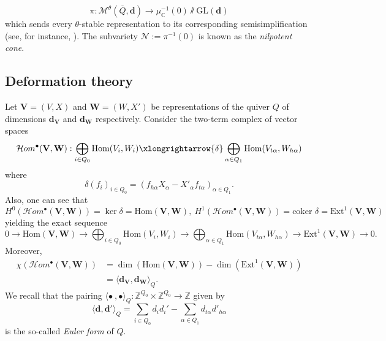 \documentclass{amsart}
\theoremstyle{plain}
\numberwithin{equation}{section}
\theoremstyle{definition}
\theoremstyle{remark}
\begin{document}
	$$
	\pi:\mathcal{M}^{\theta}(\overline{Q},\mathbf{d}) \to \mu^{-1}_{\mathbb{C}}(0)\sslash\text{GL}(\mathbf{d})
	$$ 
	which sends every $\theta$-stable representation to its corresponding semisimplification (see, for instance, \cite[Theorem 10.12]{libroKirillov}). The subvariety $\mathcal{N}:=\pi^{-1}(0)$ is known as the \emph{nilpotent cone}. 
	
	\subsection{Deformation theory}\label{deformationTheorySection}
	Let $\mathbf{V}=(V,X)$ and $\mathbf{W}=(W,X')$ be representations of the quiver $Q$ of dimensions $\mathbf{d}_\mathbf{V}$ and $\mathbf{d}_\mathbf{W}$ respectively. Consider the two-term complex of vector spaces 
	\begin{equation}\label{deformationComplexQuiverVarieties}
		\mathcal{H}om^\bullet(\mathbf{V},\mathbf{W}): \bigoplus_{i\in Q_0}\text{Hom}(V_i,W_i)\xlongrightarrow{\delta}\bigoplus_{\alpha\in Q_1}\text{Hom}(V_{t\alpha},W_{h\alpha})
	\end{equation}
	where 
	$$
	\delta(f_i)_{i\in Q_0}=(f_{h\alpha}X_{\alpha}-X'_\alpha f_{t\alpha})_{\alpha\in Q_1}.
	$$
	Also, one can see that 
	$$
	H^0(\mathcal{H}om^\bullet(\mathbf{V},\mathbf{W}))=\ker\delta=\text{Hom}(\mathbf{V},\mathbf{W}), \
	H^1(\mathcal{H}om^\bullet(\mathbf{V},\mathbf{W}))=\text{coker }\delta=\text{Ext}^1(\mathbf{V},\mathbf{W})
	$$
	yielding the exact sequence
	\begin{equation}\label{fundamentalExactSequenceQuivers}
		0\to \text{Hom}(\mathbf{V},\mathbf{W})\to  \bigoplus_{i\in Q_0}\text{Hom}(V_i,W_i) \to \bigoplus_{\alpha\in Q_1}\text{Hom}(V_{t\alpha},W_{h\alpha})\to \text{Ext}^1(\mathbf{V},\mathbf{W})\to 0.
	\end{equation}
	Moreover, 
	\begin{align*}
		\chi(\mathcal{H}om^\bullet(\mathbf{V},\mathbf{W}))&=\dim(\text{Hom}(\mathbf{V},\mathbf{W}))-\dim(\text{Ext}^1(\mathbf{V},\mathbf{W})) \\ &= \langle \mathbf{d}_\mathbf{V},\mathbf{d}_\mathbf{W}\rangle_Q.
	\end{align*}
	We recall that the pairing $\langle\bullet\ ,\bullet \rangle_Q:\mathbb{Z}^{Q_0}\times\mathbb{Z}^{Q_0}\to \mathbb{Z} $ given by
	$$
	\langle\mathbf{d},\mathbf{d}'\rangle_Q=\sum_{i\in Q_0}d_id_i'-\sum_{\alpha\in Q_1}d_{t\alpha}d'_{h\alpha}
	$$
	is the so-called \emph{Euler form} of $Q$.
	\\
	\\
\end{document}
